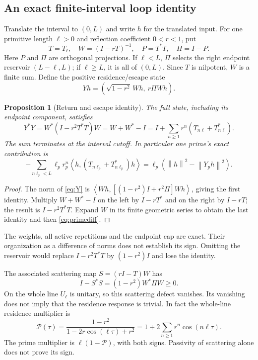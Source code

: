 \documentclass[11pt]{article}
\numberwithin{equation}{section}
\newtheorem{proposition}[theorem]{Proposition}
\theoremstyle{definition}
\theoremstyle{remark}
\newcommand{\norm}[1]{\left\lVert#1\right\rVert}
\newcommand{\ip}[2]{\left\langle#1,#2\right\rangle}
\begin{document}
\subsection{An exact finite-interval loop identity}
Translate the interval to $(0,L)$ and write $h$ for the translated input. For one primitive length $\ell>0$ and reflection coefficient $0<r<1$, put
\begin{equation}
 T=T_\ell,\quad W=(I-rT)^{-1},\quad P=T^*T,\quad\Pi=I-P.
\end{equation}
Here $P$ and $\Pi$ are orthogonal projections. If $\ell<L$, $\Pi$ selects the right endpoint reservoir $(L-\ell,L)$; if $\ell\ge L$, it is all of $(0,L)$. Since $T$ is nilpotent, $W$ is a finite sum. Define the positive residence/escape state
\begin{equation}
 Yh=(\sqrt{1-r^2}\,Wh,\ r\Pi Wh).
 \label{eq:Y}
\end{equation}
\begin{proposition}[Return and escape identity]
The full state, including its endpoint component, satisfies
\begin{equation}
 Y^*Y=W^*(I-r^2T^*T)W
 =W+W^*-I
 =I+\sum_{n\ge1}r^n(T_{n\ell}+T_{n\ell}^*).
 \label{eq:poisson}
\end{equation}
The sum terminates at the interval cutoff. In particular one prime's exact contribution is
\begin{equation}
 -\sum_{n\ell_p<L}\ell_pr_p^n
 \ip{h}{(T_{n\ell_p}+T_{n\ell_p}^*)h}
 =\ell_p(\norm h^2-\norm{Y_ph}^2).
 \label{eq:primediff}
\end{equation}
\end{proposition}
\begin{proof}
The norm of \eqref{eq:Y} is $\ip{Wh}{[(1-r^2)I+r^2\Pi]Wh}$, giving the first identity. Multiply $W+W^*-I$ on the left by $I-rT^*$ and on the right by $I-rT$; the result is $I-r^2T^*T$. Expand $W$ in its finite geometric series to obtain the last identity and then \eqref{eq:primediff}.
\end{proof}
The weights, all active repetitions and the endpoint cap are exact. Their organization as a difference of norms does not establish its sign. Omitting the reservoir would replace $I-r^2T^*T$ by $(1-r^2)I$ and lose the identity.

The associated scattering map $S=(rI-T)W$ has
\begin{equation}
 I-S^*S=(1-r^2)W^*\Pi W\ge0.
\end{equation}
On the whole line $U_\ell$ is unitary, so this scattering defect vanishes. Its vanishing does not imply that the residence response is trivial. In fact the whole-line residence multiplier is
\begin{equation}
 \mathcal P(\tau)=\frac{1-r^2}{1-2r\cos(\ell\tau)+r^2}
 =1+2\sum_{n\ge1}r^n\cos(n\ell\tau).
 \label{eq:Poissonwhole}
\end{equation}
The prime multiplier is $\ell(1-\mathcal P)$, with both signs. Passivity of scattering alone does not prove its sign.
\end{document}
